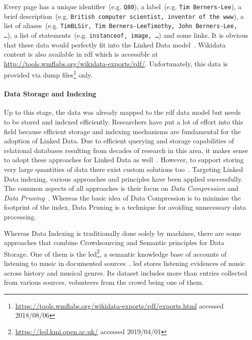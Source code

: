 Every page has a unique identifier~(e.g. \texttt{Q80}), a label~(e.g. \texttt{Tim~Berners-Lee}), a brief description~(e.g. \texttt{British computer scientist, inventor of the \gls{www}}), a list of aliases~(e.g. \texttt{TimBLSir, Tim Berners-LeeTimothy, John Berners-Lee, \ldots}), a list of statements~(e.g. \texttt{instanceof, image, \ldots}) and some links. 
It is obvious that these data would perfectly fit into the Linked Data model~\cite{erxleben2014}.
Wikidata content is also available in \gls{rdf} which is accessible at \url{http://tools.wmflabs.org/wikidata-exports/rdf/}. Unfortunately, this data is provided via dump files\footnote{\url{https://tools.wmflabs.org/wikidata-exports/rdf/exports.html} accessed 2018/08/06} only.

\paragraph{Data Storage and Indexing} 
Up to this stage, the data was already mapped to the \gls{rdf} data model but needs to be stored and indexed efficiently. Researchers have put a lot of effort into this field because efficient storage and indexing mechanisms are fundamental for the adoption of Linked Data. Due to efficient querying and storage capabilities of relational databases resulting from decades of research in this area, it makes sense to adopt these approaches for Linked Data as well~\cite{abadi2007}. However, to support storing very large quantities of data there exist custom solutions too~\cite{broekstra2002}. Targeting Linked Data indexing, various approaches and principles have been applied successfully. The common aspects of all approaches is their focus on \emph{Data Compression} and \emph{Data Pruning}~\cite{svoboda2011}. Whereas the basic idea of Data Compression is to minimise the footprint of the index, Data Pruning is a technique for avoiding unnecessary data processing. 

Whereas Data Indexing is traditionally done solely by machines, there are some approaches that combine Crowdsourcing and Semantic principles for Data Storage. One of them is the \gls{led}\footnote{\url{https://led.kmi.open.ac.uk/} accessed 2019/04/01}, a semantic knowledge base of accounts of listening to music in documented sources~\cite{adamou2014}. \gls{led} stores listening evidences of music across history and musical genres. Its dataset includes more than  entries collected from various sources, volunteers from the crowd being one of them. 

